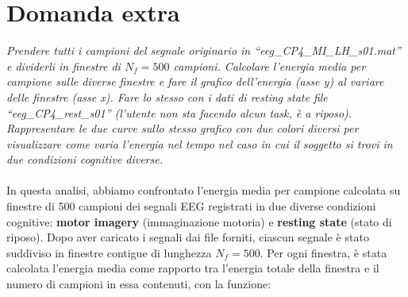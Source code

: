 \documentclass{report}
\begin{document}
\newpage

\section{Domanda extra}

\textit{Prendere tutti i campioni del segnale originario in “eeg\_CP4\_MI\_LH\_s01.mat” e
dividerli in finestre di $N_f =500$ campioni. Calcolare l’energia media per campione sulle
diverse finestre e fare il grafico dell’energia (asse y) al variare delle finestre (asse x). Fare lo stesso con i dati di resting state file “eeg\_CP4\_rest\_s01” (l’utente non sta
facendo alcun task, è a riposo). Rappresentare le due curve sullo stesso grafico con due colori diversi per visualizzare come varia l’energia nel tempo nel caso in cui il soggetto si trovi in due condizioni cognitive diverse.}\\
\\
In questa analisi, abbiamo confrontato l’energia media per campione calcolata su finestre di 500 campioni dei segnali EEG registrati in due diverse condizioni cognitive: \textbf{motor imagery} (immaginazione motoria) e \textbf{resting state} (stato di riposo). Dopo aver caricato i segnali dai file forniti, ciascun segnale è stato suddiviso in finestre contigue di lunghezza $N_f = 500$. Per ogni finestra, è stata calcolata l’energia media come rapporto tra l’energia totale della finestra e il numero di campioni in essa contenuti, con la funzione: 
\\
\end{document}
